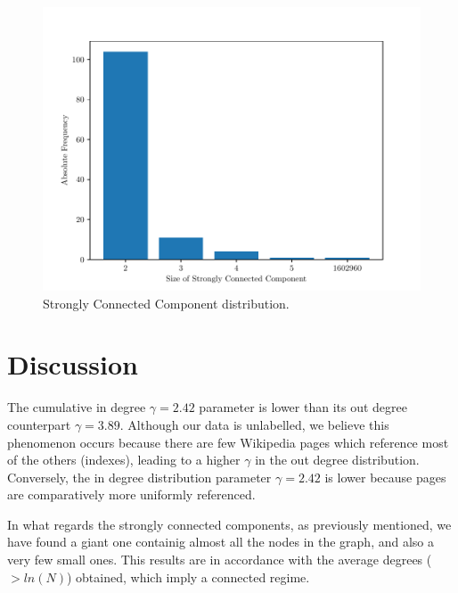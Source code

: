 \documentclass[9pt,a4paper,twocolumn]{article}
\begin{document}
\begin{figure}[h]
	\centering
	\includegraphics[width=\linewidth]{wikipedia_pt_sccdistr.pdf}
	\caption{Strongly Connected Component distribution.}
	\label{fig:sccdist}
\end{figure}



\section{Discussion}

The cumulative in degree $\gamma = 2.42$ parameter is lower than its out degree counterpart $\gamma = 3.89$. Although our data is unlabelled, we believe this phenomenon occurs because there are few Wikipedia pages which reference most of the others (indexes), leading to a higher $\gamma$ in the out degree distribution. Conversely, the in degree distribution parameter $\gamma = 2.42$ is lower because pages are comparatively more uniformly referenced.

In what regards the strongly connected components, as previously mentioned, we have found a giant one containig almost all the nodes in the graph, and also a very few small ones. This results are in accordance with the average degrees ($> ln(N)$) obtained, which imply a connected regime.







\end{document}

